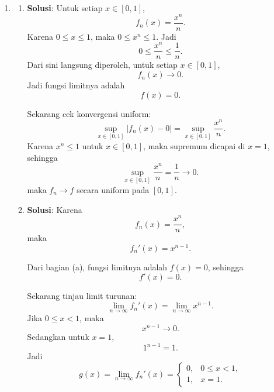 \documentclass[11pt,letterpaper]{article}
\newcommand{\jawab}{\textbf{Solusi}:}
\begin{document}
\begin{enumerate}
  \item
        \begin{enumerate}[label=\alph*)]
          \item \jawab
                Untuk setiap $x\in[0,1]$,
                \[
                  f_n(x)=\frac{x^n}{n}.
                \]
                Karena $0\le x\le 1$, maka $0\le x^n\le 1$. Jadi
                \[
                  0\le \frac{x^n}{n}\le \frac{1}{n}.
                \]
                Dari sini langsung diperoleh, untuk setiap $x\in[0,1]$,
                \[
                  f_n(x)\to 0.
                \]
                Jadi fungsi limitnya adalah
                \[
                  f(x)=0.
                \]

                Sekarang cek konvergensi uniform:
                \[
                  \sup_{x\in[0,1]} |f_n(x)-0|
                  =
                  \sup_{x\in[0,1]} \frac{x^n}{n}.
                \]
                Karena $x^n\le 1$ untuk $x\in[0,1]$, maka supremum dicapai di $x=1$, sehingga
                \[
                  \sup_{x\in[0,1]} \frac{x^n}{n} = \frac{1}{n}\to 0.
                \]
                maka $f_n\to f$ secara uniform pada $[0,1]$.

          \item \jawab
                Karena
                \[
                  f_n(x)=\frac{x^n}{n},
                \]
                maka
                \[
                  f_n'(x)=x^{n-1}.
                \]

                Dari bagian (a), fungsi limitnya adalah $f(x)=0$, sehingga
                \[
                  f'(x)=0.
                \]

                Sekarang tinjau limit turunan:
                \[
                  \lim_{n\to\infty} f_n'(x)
                  =
                  \lim_{n\to\infty} x^{n-1}.
                \]
                Jika $0\le x<1$, maka
                \[
                  x^{n-1}\to 0.
                \]
                Sedangkan untuk $x=1$,
                \[
                  1^{n-1}=1.
                \]
                Jadi
                \[
                  g(x)=\lim_{n\to\infty} f_n'(x)
                  =
                  \begin{cases}
                    0, & 0\le x<1, \\
                    1, & x=1.
                  \end{cases}
                \]


\end{enumerate}
\end{enumerate}
\end{document}
